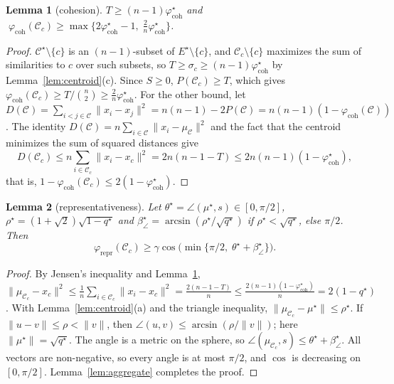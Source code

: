 \documentclass[10pt]{article}
\newtheorem{lemma}{Lemma}
\theoremstyle{remark}
\theoremstyle{definition}
\newcommand{\coh}{\varphi_{\text{coh}}}
\newcommand{\rep}{\varphi_{\text{repr}}}
\newcommand{\C}{\mathcal{C}}
\begin{document}
\begin{lemma}[cohesion]\label{lem:coh}
$T \ge (n-1)\coh^\star$ and $\;\coh(\C_c) \ge \max\big\{ 2\coh^\star - 1,\; \tfrac{2}{n}\coh^\star \big\}$.
\end{lemma}
\begin{proof}
$\C^\star \setminus \{c\}$ is an $(n-1)$-subset of $E^\star \setminus \{c\}$, and $\C_c \setminus \{c\}$ maximizes the
sum of similarities to $c$ over such subsets, so $T \ge \sigma_c \ge (n-1)\coh^\star$ by Lemma~\ref{lem:centroid}(c).
Since $S \ge 0$, $P(\C_c) \ge T$, which gives $\coh(\C_c) \ge T/\binom{n}{2} \ge \frac{2}{n}\coh^\star$. For the
other bound, let $D(\C) = \sum_{i<j \in \C} \|x_i - x_j\|^2 = n(n-1) - 2P(\C) = n(n-1)(1 - \coh(\C))$. The identity
$D(\C) = n \sum_{i \in \C} \|x_i - \mu_\C\|^2$ and the fact that the centroid minimizes the sum of squared distances
give
\[
D(\C_c) \le n \sum_{i \in \C_c} \|x_i - x_c\|^2 = 2n(n-1-T) \le 2n(n-1)(1 - \coh^\star),
\]
that is, $1 - \coh(\C_c) \le 2(1 - \coh^\star)$.
\end{proof}

\begin{lemma}[representativeness]\label{lem:repr}
Let $\theta^\star = \angle(\mu^\star, s) \in [0, \pi/2]$, $\rho^\star = (1 + \sqrt{2})\sqrt{1 - q^\star}$ and
$\beta^\star_{\angle} = \arcsin(\rho^\star/\sqrt{q^\star})$ if $\rho^\star < \sqrt{q^\star}$, else $\pi/2$. Then
\[
\rep(\C_c) \ge \gamma \cos\big(\min\{\pi/2,\; \theta^\star + \beta^\star_{\angle}\}\big) .
\]
\end{lemma}
\begin{proof}
By Jensen's inequality and Lemma~\ref{lem:coh}, $\|\mu_{\C_c} - x_c\|^2 \le \frac{1}{n}\sum_{i \in \C_c} \|x_i -
x_c\|^2 = \frac{2(n-1-T)}{n} \le \frac{2(n-1)(1-\coh^\star)}{n} = 2(1 - q^\star)$. With Lemma~\ref{lem:centroid}(a)
and the triangle inequality, $\|\mu_{\C_c} - \mu^\star\| \le \rho^\star$. If $\|u - v\| \le \rho < \|v\|$, then
$\angle(u, v) \le \arcsin(\rho/\|v\|)$; here $\|\mu^\star\| = \sqrt{q^\star}$. The angle is a metric on the sphere, so
$\angle(\mu_{\C_c}, s) \le \theta^\star + \beta^\star_\angle$. All vectors are non-negative, so every angle is at most
$\pi/2$, and $\cos$ is decreasing on $[0, \pi/2]$. Lemma~\ref{lem:aggregate} completes the proof.
\end{proof}
\end{document}
